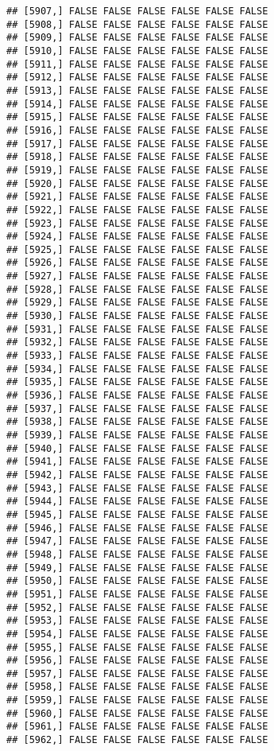 \documentclass[
]{article}
\begin{document}
\begin{verbatim}
## [5907,] FALSE FALSE FALSE FALSE FALSE FALSE
## [5908,] FALSE FALSE FALSE FALSE FALSE FALSE
## [5909,] FALSE FALSE FALSE FALSE FALSE FALSE
## [5910,] FALSE FALSE FALSE FALSE FALSE FALSE
## [5911,] FALSE FALSE FALSE FALSE FALSE FALSE
## [5912,] FALSE FALSE FALSE FALSE FALSE FALSE
## [5913,] FALSE FALSE FALSE FALSE FALSE FALSE
## [5914,] FALSE FALSE FALSE FALSE FALSE FALSE
## [5915,] FALSE FALSE FALSE FALSE FALSE FALSE
## [5916,] FALSE FALSE FALSE FALSE FALSE FALSE
## [5917,] FALSE FALSE FALSE FALSE FALSE FALSE
## [5918,] FALSE FALSE FALSE FALSE FALSE FALSE
## [5919,] FALSE FALSE FALSE FALSE FALSE FALSE
## [5920,] FALSE FALSE FALSE FALSE FALSE FALSE
## [5921,] FALSE FALSE FALSE FALSE FALSE FALSE
## [5922,] FALSE FALSE FALSE FALSE FALSE FALSE
## [5923,] FALSE FALSE FALSE FALSE FALSE FALSE
## [5924,] FALSE FALSE FALSE FALSE FALSE FALSE
## [5925,] FALSE FALSE FALSE FALSE FALSE FALSE
## [5926,] FALSE FALSE FALSE FALSE FALSE FALSE
## [5927,] FALSE FALSE FALSE FALSE FALSE FALSE
## [5928,] FALSE FALSE FALSE FALSE FALSE FALSE
## [5929,] FALSE FALSE FALSE FALSE FALSE FALSE
## [5930,] FALSE FALSE FALSE FALSE FALSE FALSE
## [5931,] FALSE FALSE FALSE FALSE FALSE FALSE
## [5932,] FALSE FALSE FALSE FALSE FALSE FALSE
## [5933,] FALSE FALSE FALSE FALSE FALSE FALSE
## [5934,] FALSE FALSE FALSE FALSE FALSE FALSE
## [5935,] FALSE FALSE FALSE FALSE FALSE FALSE
## [5936,] FALSE FALSE FALSE FALSE FALSE FALSE
## [5937,] FALSE FALSE FALSE FALSE FALSE FALSE
## [5938,] FALSE FALSE FALSE FALSE FALSE FALSE
## [5939,] FALSE FALSE FALSE FALSE FALSE FALSE
## [5940,] FALSE FALSE FALSE FALSE FALSE FALSE
## [5941,] FALSE FALSE FALSE FALSE FALSE FALSE
## [5942,] FALSE FALSE FALSE FALSE FALSE FALSE
## [5943,] FALSE FALSE FALSE FALSE FALSE FALSE
## [5944,] FALSE FALSE FALSE FALSE FALSE FALSE
## [5945,] FALSE FALSE FALSE FALSE FALSE FALSE
## [5946,] FALSE FALSE FALSE FALSE FALSE FALSE
## [5947,] FALSE FALSE FALSE FALSE FALSE FALSE
## [5948,] FALSE FALSE FALSE FALSE FALSE FALSE
## [5949,] FALSE FALSE FALSE FALSE FALSE FALSE
## [5950,] FALSE FALSE FALSE FALSE FALSE FALSE
## [5951,] FALSE FALSE FALSE FALSE FALSE FALSE
## [5952,] FALSE FALSE FALSE FALSE FALSE FALSE
## [5953,] FALSE FALSE FALSE FALSE FALSE FALSE
## [5954,] FALSE FALSE FALSE FALSE FALSE FALSE
## [5955,] FALSE FALSE FALSE FALSE FALSE FALSE
## [5956,] FALSE FALSE FALSE FALSE FALSE FALSE
## [5957,] FALSE FALSE FALSE FALSE FALSE FALSE
## [5958,] FALSE FALSE FALSE FALSE FALSE FALSE
## [5959,] FALSE FALSE FALSE FALSE FALSE FALSE
## [5960,] FALSE FALSE FALSE FALSE FALSE FALSE
## [5961,] FALSE FALSE FALSE FALSE FALSE FALSE
## [5962,] FALSE FALSE FALSE FALSE FALSE FALSE

\end{verbatim}
\end{document}
